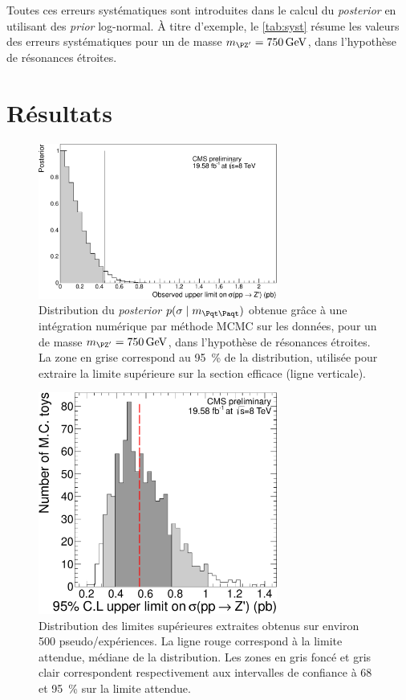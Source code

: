 Toutes ces erreurs systématiques sont introduites dans le calcul du \emph{posterior} en utilisant des \emph{prior} log-normal. À titre d'exemple, le \cref{tab:syst} résume les valeurs des erreurs systématiques pour un \zprime de masse $\mzp = \SI{750}{\GeV}$, dans l'hypothèse de résonances étroites.

\section{Résultats}

\begin{figure}[p!]
  \centering
  \includegraphics[width=0.7\textwidth]{chapitre7/figs/posterior_plot_750.pdf}
  \caption{Distribution du \emph{posterior} $p(\sigma \mid \mtt)$ obtenue grâce à une intégration numérique par méthode MCMC sur les données, pour un \zprime de masse $\mzp = \SI{750}{\GeV}$, dans l'hypothèse de résonances étroites. La zone en grise correspond au \SI{95}{\percent} de la distribution, utilisée pour extraire la limite supérieure sur la section efficace (ligne verticale).}
  \label{fig:posterior}
\end{figure}

\begin{figure}[p!]
  \centering
  \includegraphics[width=0.7\textwidth]{chapitre7/figs/posterior_plot_expected_750.pdf}
  \caption{Distribution des limites supérieures extraites obtenus sur environ 500 pseudo\-/expériences. La ligne rouge correspond à la limite attendue, médiane de la distribution. Les zones en gris foncé et gris clair correspondent respectivement aux intervalles de confiance à 68 et \SI{95}{\%} sur la limite attendue.}
  \label{fig:posterior_mc}
\end{figure}

